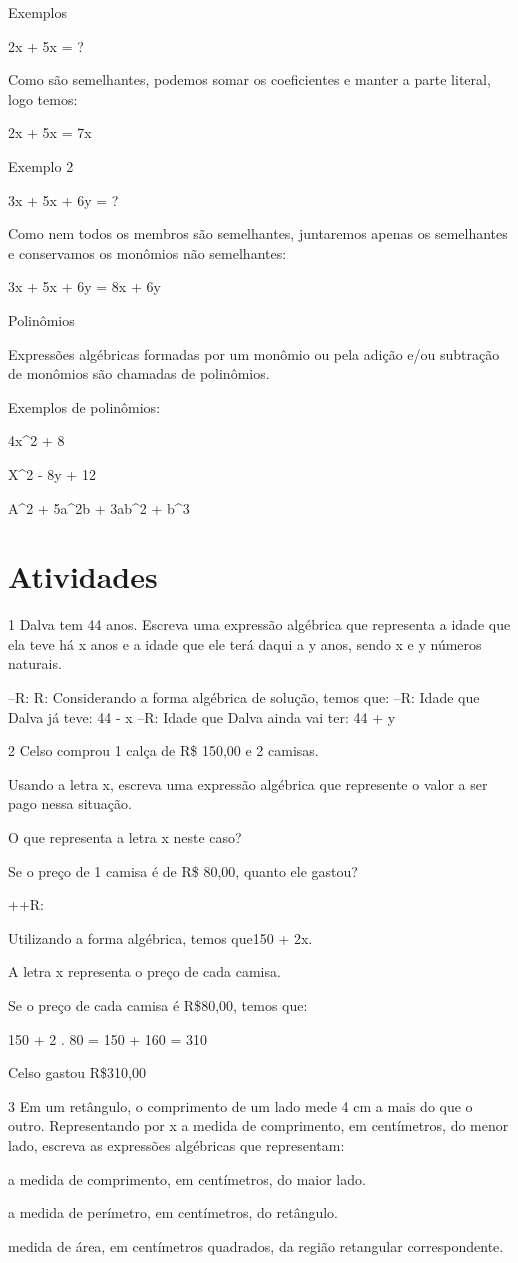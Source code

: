 {Exemplos

2x + 5x = ?

Como são semelhantes, podemos somar os coeficientes e manter a parte
literal, logo temos:

2x + 5x = 7x

Exemplo 2

3x + 5x + 6y = ?

Como nem todos os membros são semelhantes, juntaremos apenas os
semelhantes e conservamos os monômios não semelhantes:

3x + 5x + 6y = 8x + 6y

Polinômios

Expressões algébricas formadas por um monômio ou pela adição e/ou
subtração de monômios são chamadas de polinômios.

Exemplos de polinômios:

4x^2 + 8

X^2 - 8y + 12

A^2 + 5a^2b + 3ab^2 + b^3

\section{Atividades}

\num{1} Dalva tem 44 anos. Escreva uma expressão algébrica que representa a
idade que ela teve há x anos e a idade que ele terá daqui a y anos,
sendo x e y números naturais.

--R: R: Considerando a forma algébrica de solução, temos que:
--R: Idade que Dalva já teve: 44 - x
--R: Idade que Dalva ainda vai ter: 44 + y

\num{2} Celso comprou 1 calça de R\$ 150,00 e 2 camisas.
\item Usando a letra x, escreva uma expressão algébrica que represente o
valor a ser pago nessa situação.
\item O que representa a letra x neste caso?
\item Se o preço de 1 camisa é de R\$ 80,00, quanto ele gastou?

++R: 
\item Utilizando a forma algébrica, temos que150 + 2x.
\item A letra x representa o preço de cada camisa.
\item Se o preço de cada camisa é R\$80,00, temos que:

150 + 2 . 80 = 150 + 160 = 310

Celso gastou R\$310,00

\num{3} Em um retângulo, o comprimento de um lado mede 4 cm a mais do que o
outro. Representando por x a medida de comprimento, em centímetros, do
menor lado, escreva as expressões algébricas que representam:
\item a medida de comprimento, em centímetros, do maior lado.
\item a medida de perímetro, em centímetros, do retângulo.
\item medida de área, em centímetros quadrados, da região retangular
correspondente.

}
